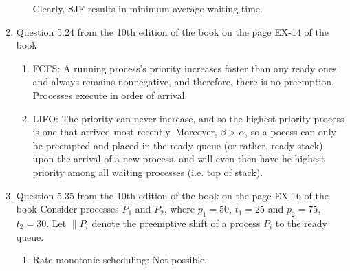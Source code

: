 \documentclass{amsart}
\begin{document}
\begin{enumerate}
\begin{enumerate}
                    Clearly, SJF results in minimum average waiting time.

            
               \end{enumerate}

        \item Question 5.24 from the 10th edition of the book on the page EX-14 of the book
        \begin{enumerate}
            \item FCFS: A running process's priority increases faster than any ready ones and always remains nonnegative, and therefore, there is no preemption. Processes execute in order of arrival.
            \item LIFO: The priority can never increase, and so the highest priority process is one that arrived most recently. Moreover, \(\beta > \alpha\), so a pocess can only be preempted and placed in the ready queue (or rather, ready stack) upon the arrival of a new process, and will even then have he highest priority among all waiting processes (i.e. top of stack). 
        \end{enumerate}
        \item Question 5.35 from the 10th edition of the book on the page EX-16 of the book
            Consider processes $P_1$ and $P_2$, where $p_1 = 50$, $t_1 = 25$ and $p_2 = 75$, $t_2 = 30$.   
            Let \(\| P_i \)  denote the preemptive shift of a process $P_i$ to the ready queue.

        \begin{enumerate}
                \item Rate-monotonic scheduling: Not possible.
                    

\end{enumerate}
\end{enumerate}
\end{document}
